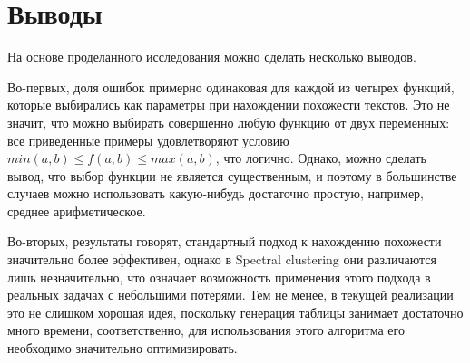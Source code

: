 \section{Выводы}
На основе проделанного исследования можно сделать несколько выводов.

Во-первых, доля ошибок примерно одинаковая для каждой из четырех функций, которые выбирались как параметры при нахождении похожести текстов. Это не значит, что можно выбирать совершенно любую функцию от двух переменных: все приведенные примеры удовлетворяют условию $min(a, b) \leq f(a, b) \leq max(a, b)$, что логично. Однако, можно сделать вывод, что выбор функции не является существенным, и поэтому в большинстве случаев можно использовать какую-нибудь достаточно простую, например, среднее арифметическое.

Во-вторых, результаты говорят, стандартный подход к нахождению похожести значительно более эффективен, однако в Spectral clustering они различаются лишь незначительно, что означает возможность применения этого подхода в реальных задачах с небольшими потерями. Тем не менее, в текущей реализации это не слишком хорошая идея, поскольку генерация таблицы занимает достаточно много времени, соответственно, для использования этого алгоритма его необходимо значительно оптимизировать.